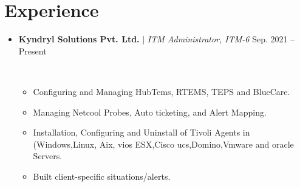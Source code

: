 \documentclass[letterpaper, 12pt]{article}
\begin{document}
\section*{Experience}
	\begin{itemize}
		\item {\begin{Large}
				\textbf{Kyndryl Solutions Pvt. Ltd.} $|$ \textit{ITM Administrator, ITM-6}	
		 \hfill{Sep. 2021 -- Present}\end{Large}}\\
	 			\vspace*{-0.55cm}
			\begin{itemize}
				\item {Configuring and Managing HubTems, RTEMS, TEPS and BlueCare.}
				\item {Managing Netcool Probes, Auto ticketing, and Alert Mapping.}
				\item {Installation, Configuring and Uninstall of Tivoli Agents in (Windows,Linux, Aix, vios ESX,Cisco ucs,Domino,Vmware and oracle Servers.}
				\item {Built client-specific situations/alerts.}
				

\end{itemize}
\end{itemize}
\end{document}

